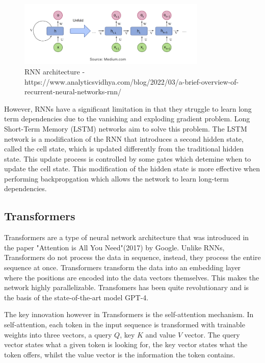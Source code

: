 \documentclass[11pt]{article}
\begin{document}
\begin{figure}[h]
\centering
\includegraphics[width=0.8\textwidth]{rnn.png}
\caption{RNN architecture - https://www.analyticsvidhya.com/blog/2022/03/a-brief-overview-of-recurrent-neural-networks-rnn/}
\label{fig:lorenz_attractor}
\end{figure}

However, RNNs have a significant limitation in that they struggle to learn long term dependencies due to the vanishing and exploding gradient problem. Long Short-Term Memory (LSTM) networks  aim to solve this problem. The LSTM network is a modification of the RNN that introduces a second hidden state, called the cell state, which is updated differently from the traditional hidden state. This update process is controlled by some gates which detemine when to update the cell state. This modification of the hidden state is more effective when performing backpropgation which allows the network to learn long-term dependencies.

\subsection{Transformers}

Transformers are a type of neural network architecture that was introduced in the paper "Attention is All You Need"(2017) by Google. Unlike RNNs, Transformers do not process the data in sequence, instead, they process the entire sequence at once. Transformers transform the data into an embedding layer where the positions are encoded into the data vectors themselves. This makes the network highly parallelizable. Transfomers has been quite revolutionary and is the basis of the state-of-the-art model GPT-4.

The key innovation however in Transformers is the self-attention mechanism. In self-attention, each token in the input sequence is transformed with trainable weights into three vectors, a query $Q$, key $K$ and value $V$ vector. The query vector states what a given token is looking for, the key vector states what the token offers, whilst the value vector is the information the token contains.
\end{document}
